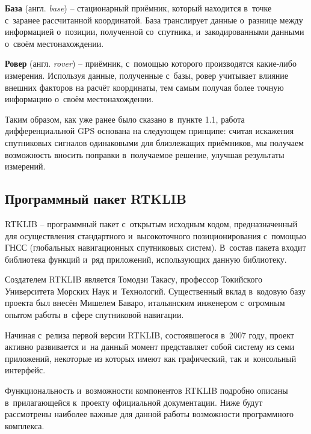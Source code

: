 \begin{dashitemize}
  \item \textbf{База} (англ. \emph{base}) -- стационарный приёмник, который находится в~точке с~заранее рассчитанной координатой. База транслирует данные о~разнице между информацией о~позиции, полученной со~спутника, и~закодированными данными о~своём местонахождении.
  \item \textbf{Ровер} (англ. \emph{rover}) -- приёмник, с~помощью которого производятся какие-либо измерения. Используя данные, полученные с~базы, ровер учитывает влияние внешних факторов на расчёт координаты, тем самым получая более точную информацию о~своём местонахождении.
\end{dashitemize}

Таким образом, как уже ранее было сказано в~пункте 1.1, работа дифференциальной GPS основана на следующем принципе: считая искажения спутниковых сигналов одинаковыми для близлежащих приёмников, мы получаем возможность вносить поправки в~получаемое решение, улучшая результаты измерений.

\subsection{Программный пакет RTKLIB}

RTKLIB -- программный пакет с~открытым исходным кодом, предназначенный для осуществления стандартного и~высокоточного позиционирования с~помощью ГНСС (глобальных навигационных спутниковых систем). В~состав пакета входит библиотека функций и~ряд приложений, использующих данную библиотеку. \par

Создателем RTKLIB является Томодзи Такасу, профессор Токийского Университета Морских Наук и~Технологий. Существенный вклад в~кодовую базу проекта был внесён Мишелем Баваро, итальянским инженером с~огромным опытом работы в~сфере спутниковой навигации. \par

Начиная с~релиза первой версии RTKLIB, состоявшегося в~2007 году, проект активно развивается и~на данный момент представляет собой систему из семи приложений, некоторые из которых имеют как графический, так и~консольный интерфейс. \par

Функциональность и~возможности компонентов RTKLIB подробно описаны в~прилагающейся к~проекту официальной документации. Ниже будут рассмотрены наиболее важные для данной работы возможности программного комплекса.

